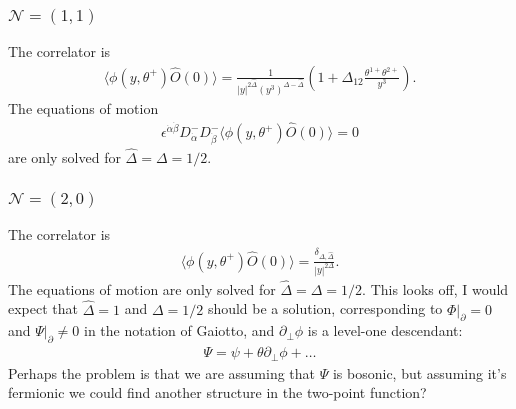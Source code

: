 \documentclass[letterpaper]{article}
\let\Oldsubsubsection\subsubsection
\renewcommand{\subsubsection}{\FloatBarrier\Oldsubsubsection}
\def\Nm{{\mathcal{N}}}
\def\ad{{\dot{\alpha}}}
\def\bd{{\dot{\beta}}}
\begin{document}
\subsubsection{\texorpdfstring{$\Nm = (1,1)$}{}}

The correlator is
\begin{align}
 \langle \phi(y, \theta^+) \hat O(0) \rangle
 = \frac{1}{|y|^{2 \hat \Delta} (y^3)^{\Delta-\hat \Delta}} \left(
  1 + \Delta_{12} \frac{\theta^{1+} \theta^{2+}}{y^3}
 \right).
\end{align}
The equations of motion 
\begin{align}
 \epsilon^{\ad\bd} D^{-}_\ad D^{-}_\bd \langle \phi(y, \theta^+) \hat O(0) \rangle = 0
\end{align}
are only solved for $\hat \Delta = \Delta = 1/2$.

\subsubsection{\texorpdfstring{$\Nm = (2,0)$}{}}

The correlator is
\begin{align}
 \langle \phi(y, \theta^+) \hat O(0) \rangle
 = \frac{\delta_{\Delta,\hat\Delta}}{|y|^{2 \Delta}}.
\end{align}
The equations of motion are only solved for $\hat \Delta = \Delta = 1/2$.
This looks off, I would expect that $\hat \Delta = 1$ and $\Delta = 1/2$ should be a solution, corresponding to $\Phi|_{\partial} = 0$ and $\Psi|_{\partial} \ne 0$ in the notation of Gaiotto, and $\partial_{\bot} \phi$ is a level-one descendant:
\begin{align}
 \Psi = \psi + \theta \partial_{\bot} \phi + \ldots
\end{align}
Perhaps the problem is that we are assuming that $\Psi$ is bosonic, but assuming it's fermionic we could find another structure in the two-point function?
\end{document}
